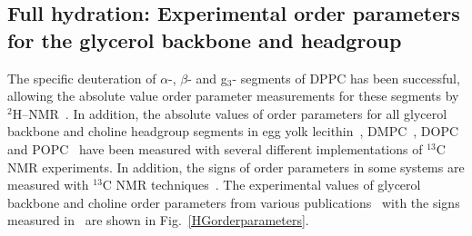 \documentclass[journal=jacsat,manuscript=article]{achemso}
\begin{document}
\subsection{Full hydration: Experimental order parameters for the glycerol backbone and headgroup}\label{experiments}
The specific deuteration of $\alpha$-, $\beta$- and g$_3$- segments of DPPC has been successful, 
allowing the absolute value order parameter measurements for these segments by $^2$H--NMR~\cite{gally75,brown77,brown78,akutsu81}.
In addition, the absolute values of order parameters for all glycerol backbone and choline headgroup segments in egg yolk lecithin~\cite{hong95a},
DMPC~\cite{hong95b,gross97,dvinskikh05a}, DOPC~\cite{warschawski05} and POPC~\cite{warschawski05,ferreira13}
have been measured with several different implementations of $^{13}$C NMR experiments. In addition, the signs of order parameters in some systems
are measured with $^{13}$C NMR techniques~\cite{hong95a,hong95b,gross97}. The experimental values of glycerol backbone 
and choline order parameters from various publications~\cite{gally75,akutsu81,gross97,dvinskikh05a,ferreira13} with the signs measured in~\cite{hong95a,hong95b,gross97} are shown in Fig.~\ref{HGorderparameters}.
\end{document}
